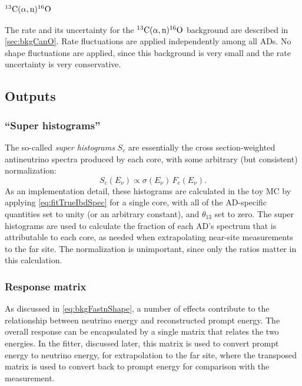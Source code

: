 \documentclass[../thesis.tex]{subfiles}
\begin{document}
\subsubsection{$^{13}\mathrm{C}(\alpha, \mathrm{n})^{16}\mathrm{O}$}

The rate and its uncertainty for the $^{13}\mathrm{C}(\alpha, \mathrm{n})^{16}\mathrm{O}$ background are described in
\autoref{sec:bkgCanO}. Rate fluctuations are applied independently among all
ADs. No shape fluctuations are applied, since this background is very small and
the rate uncertainty is very conservative.

\subsection{Outputs}
\label{sec:fitToyOutputs}

\subsubsection{``Super histograms''}

The so-called \emph{super histograms} $S_c$ are essentially the cross
section-weighted antineutrino spectra produced by each core, with some arbitrary
(but consistent) normalization:
\begin{equation*}
  S_c(E_\nu) \propto \sigma(E_\nu)\,F_c(E_\nu).
\end{equation*}
As an implementation detail, these histograms are calculated in the toy MC by
applying \autoref{eq:fitTrueIbdSpec} for a single core, with all of the
AD-specific quantities set to unity (or an arbitrary constant), and
$\theta_{13}$ set to zero. The super histograms are used to calculate the
fraction of each AD's spectrum that is attributable to each core, as needed when
extrapolating near-site measurements to the far site. The normalization is
unimportant, since only the ratios matter in this calculation.

\subsubsection{Response matrix}

As discussed in \autoref{eq:bkgFastnShape}, a number of effects contribute to
the relationship between neutrino energy and reconstructed prompt energy. The
overall response can be encapsulated by a single matrix that relates the two
energies. In the fitter, discussed later, this matrix is used to convert prompt
energy to neutrino energy, for extrapolation to the far site, where the
transposed matrix is used to convert back to prompt energy for comparison with
the measurement.
\end{document}
